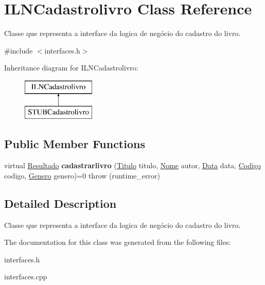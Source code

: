 \hypertarget{classILNCadastrolivro}{}\section{I\+L\+N\+Cadastrolivro Class Reference}
\label{classILNCadastrolivro}


Classe que representa a interface da logica de negócio do cadastro do livro.  




{\ttfamily \#include $<$interfaces.\+h$>$}

Inheritance diagram for I\+L\+N\+Cadastrolivro\+:\begin{figure}[H]
\begin{center}
\leavevmode
\includegraphics[height=2.000000cm]{classILNCadastrolivro}
\end{center}
\end{figure}
\subsection*{Public Member Functions}
\begin{DoxyCompactItemize}
\item 
\mbox{\label{classILNCadastrolivro_a88ba46808fe59c8e4df1cab259e4b674}} 
virtual \hyperlink{classResultado}{Resultado} {\bfseries cadastrarlivro} (\hyperlink{classTitulo}{Titulo} titulo, \hyperlink{classNome}{Nome} autor, \hyperlink{classData}{Data} data, \hyperlink{classCodigo}{Codigo} codigo, \hyperlink{classGenero}{Genero} genero)=0  throw (runtime\+\_\+error)
\end{DoxyCompactItemize}


\subsection{Detailed Description}
Classe que representa a interface da logica de negócio do cadastro do livro. 

The documentation for this class was generated from the following files\+:\begin{DoxyCompactItemize}
\item 
interfaces.\+h\item 
interfaces.\+cpp\end{DoxyCompactItemize}
